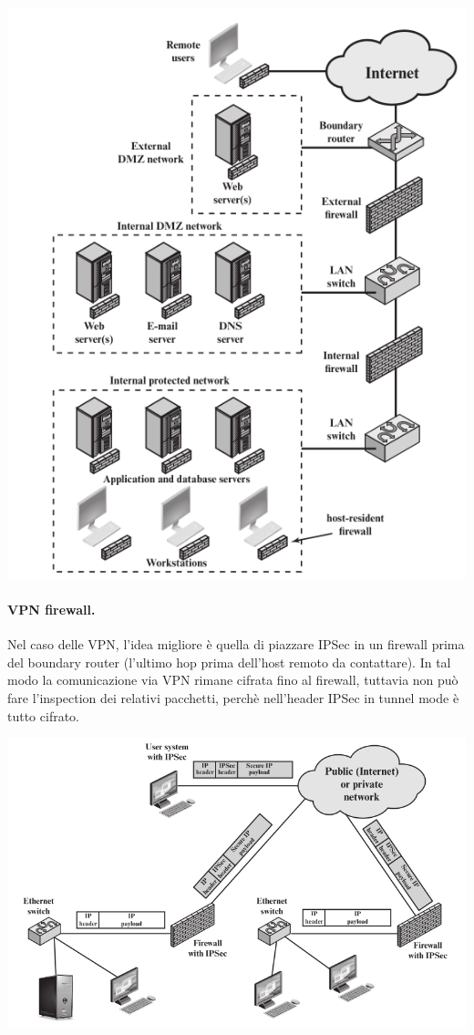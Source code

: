 \documentclass[a4paper, 10pt, twoside]{article}
\begin{document}
	\begin{center}
		\includegraphics[scale=0.4]{img/frw_dmz.png}	
	\end{center}
	

	\paragraph{VPN firewall.} Nel caso delle VPN, l'idea migliore è quella di piazzare IPSec in un firewall prima del boundary router (l'ultimo hop prima dell'host remoto da contattare). In tal modo la comunicazione via VPN rimane cifrata fino al firewall, tuttavia non può fare l'inspection dei relativi pacchetti, perchè nell'header IPSec in tunnel mode è tutto cifrato.

	\begin{center}
		\includegraphics[scale=0.4]{img/vpnfirewall.png}
	\end{center}
\end{document}
